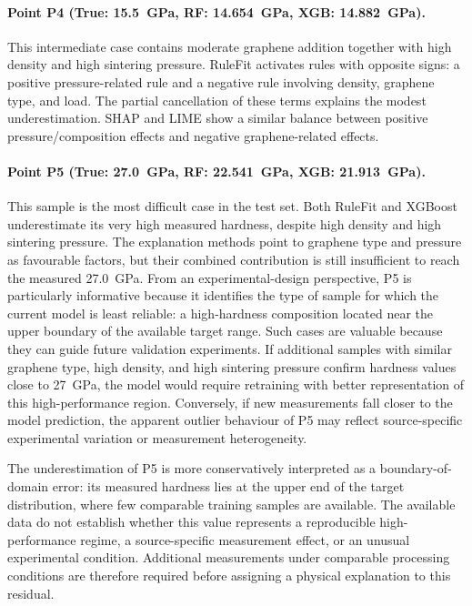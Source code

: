 \documentclass[pdflatex,sn-mathphys-num]{sn-jnl}%
\theoremstyle{thmstyleone}%
\theoremstyle{thmstyletwo}%
\theoremstyle{thmstylethree}%
\begin{document}
\paragraph{Point P4 (True: 15.5~GPa, RF: 14.654~GPa, XGB: 14.882~GPa).}
This intermediate case contains moderate graphene addition together with high density and high sintering pressure. RuleFit activates rules with opposite signs: a positive pressure-related rule and a negative rule involving density, graphene type, and load. The partial cancellation of these terms explains the modest underestimation. SHAP and LIME show a similar balance between positive pressure/composition effects and negative graphene-related effects.

\paragraph{Point P5 (True: 27.0~GPa, RF: 22.541~GPa, XGB: 21.913~GPa).}
This sample is the most difficult case in the test set. Both RuleFit and XGBoost underestimate its very high measured hardness, despite high density and high sintering pressure. The explanation methods point to graphene type and pressure as favourable factors, but their combined contribution is still insufficient to reach the measured 27.0~GPa. From an experimental-design perspective, P5 is particularly informative because it identifies the type of sample for which the current model is least reliable: a high-hardness composition located near the upper boundary of the available target range. Such cases are valuable because they can guide future validation experiments. If additional samples with similar graphene type, high density, and high sintering pressure confirm hardness values close to 27~GPa, the model would require retraining with better representation of this high-performance region. Conversely, if new measurements fall closer to the model prediction, the apparent outlier behaviour of P5 may reflect source-specific experimental variation or measurement heterogeneity.

The underestimation of P5 is more conservatively interpreted as a boundary-of-domain error: its measured hardness lies at the upper end of the target distribution, where few comparable training samples are available. The available data do not establish whether this value represents a reproducible high-performance regime, a source-specific measurement effect, or an unusual experimental condition. Additional measurements under comparable processing conditions are therefore required before assigning a physical explanation to this residual.
\end{document}
